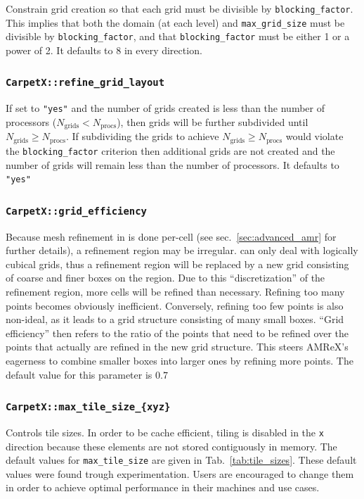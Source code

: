 Constrain grid creation so that each grid must be divisible by \texttt{blocking\_factor}. This implies that both the domain (at each level) and \texttt{max\_grid\_size} must be divisible by \texttt{blocking\_factor}, and that \texttt{blocking\_factor} must be either 1 or a power of 2. It defaults to 8 in every direction.

\subsubsection{\texttt{CarpetX::refine\_grid\_layout}}

If set to \texttt{"yes"} and the number of grids created is less than the number of processors ($N_\text{grids} < N_\text{procs}$), then grids will be further subdivided until $N_\text{grids} \geq N_\text{procs}$. If subdividing the grids to achieve $N_\text{grids} \geq N_\text{procs}$ would violate the \texttt{blocking\_factor} criterion then additional grids are not created and the number of grids will remain less than the number of processors. It defaults to \texttt{"yes"}

\subsubsection{\texttt{CarpetX::grid\_efficiency}}

Because mesh refinement in \AMReX is done per-cell (see sec.~\ref{sec:advanced_amr} for further details), a refinement region may be irregular. \AMReX\space can only deal with logically cubical grids, thus a refinement region will be replaced by a new grid consisting of coarse and finer boxes on the region. Due to this ``discretization'' of the refinement region, more cells will be refined than necessary. Refining too many points becomes obviously inefficient. Conversely, refining too few points is also non-ideal, as it leads to a grid structure consisting of many small boxes. ``Grid efficiency'' then refers to the ratio of the points that need to be refined over the points that actually are refined in the new grid structure. This steers AMReX's eagerness to combine smaller boxes into larger ones by refining more points. The default value for this parameter is $0.7$

\subsubsection{\texttt{CarpetX::max\_tile\_size\_\{xyz\}}}

Controls tile sizes. In order to be cache efficient, tiling is disabled in the \texttt{x} direction because these elements are not stored contiguously in memory. The default values for \texttt{max\_tile\_size} are given in Tab.~\ref{tab:tile_sizes}. These default values were found trough experimentation. Users are encouraged to change them in order to achieve optimal performance in their machines and use cases.


